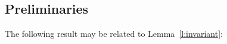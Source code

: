 \begin{comment}
\subsection{Languages Under Consideration}
We consider the following variants of \HOp:
\begin{enumerate}[-]
	\item	\HO: the second and third lines of the syntax of processes in Fig.~\ref{fig:syntax} (pure higher-order, monadic communication).
	\item	\sesp: the first and third lines of the syntax of processes in Fig.~\ref{fig:syntax} (first-order, monadic communication).
	\item	\sespnr: the finite sub-calculus of \sesp, i.e., name passing without recursion.
	\item	$\HO^{+\mathsf{p}}$: The polyadic \HO, i.~e.\ without polyadicity (polyadic abstraction/application).
	\item	$\sesp^{+\mathsf{p}}$: The polyadic \sesp, i.~e.\ with polyadicity (name passing)
	\item	$\HOp^{-\mathsf{p}}$: The monadic \HOp.
\end{enumerate}
\noindent
In the following we write $\pmap{\cdot}{i}$
and $\tmap{\cdot}{i}$ 
for mappings of processes and types, respectively.
Since we always consider variants and fragments of \HOp, the 
reduction semantics $\red$, the typed behavioral equivalence $\wb$,
and the type system $\proves$ are the same for all languages.
\end{comment}

\subsection*{Preliminaries}

The following result may be related to Lemma~\ref{l:invariant}:

